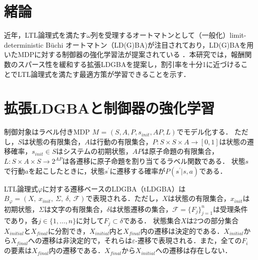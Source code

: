 \documentclass[a4j,9pt,twocolumn]{jsarticle}
\theoremstyle{definition}
\begin{document}

\section{緒論}
近年，LTL論理式を満たす$\omega$列を受理するオートマトンとして（一般化）limit-deterministic B\"{u}chi オートマトン（LD(G)BA)が注目されており，LD(G)BAを用いたMDPに対する制御器の強化学習法が提案されている \cite{HAK2019,Hahn2019}．本研究では，報酬関数のスパース性を緩和する拡張LDGBAを提案し，割引率を十分1に近づけることでLTL論理式を満たす最適方策が学習できることを示す．

\section{拡張LDGBAと制御器の強化学習}
制御対象はラベル付きMDP $M$ = $(S, A, P, s_{init}, AP, L)$でモデル化する．
ただし，$S$は状態の有限集合，$A$は行動の有限集合，$P : S \times S \times A \to [0,1]$は状態の遷移確率，$s_{init} \in S$はシステムの初期状態，$AP$は原子命題の有限集合，$L : S \times A \times S \to 2^{AP}$は各遷移に原子命題を割り当てるラベル関数である．
状態$s$で行動$a$を起こしたときに，状態$s^{\prime}$に遷移する確率が$P(s^{\prime}|s,a)$である．

LTL論理式$\varphi$に対する遷移ベースのLDGBA（tLDGBA）は$B_{\varphi}= (X,\ x_{init},\ \Sigma,\ \delta,\ \mathcal{F})$で表現される．ただし，$X$は状態の有限集合，$x_{init}$は初期状態，$\Sigma$は文字の有限集合，$\delta$は状態遷移の集合，$\mathcal{F}=\{ F_j \} _{j=1}^{n}$は受理条件であり，各$j\in\{ 1,\ldots,  n \}$に対して$F_j \subset \delta$である．
状態集合$X$は2つの部分集合$X_{initial}$と$X_{final}$に分割でき，$X_{initial}$内と$X_{final}$内の遷移は決定的である．$X_{initial}$から$X_{final}$への遷移は非決定的で，それらは$\varepsilon$-遷移で表現される．また，全ての$F_i$の要素は$X_{final}$内の遷移である．$X_{final}$から$X_{initial}$への遷移は存在しない．
\end{document}
